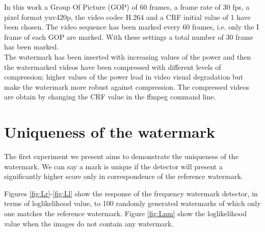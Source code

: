 In this work a Group Of Picture (GOP) of 60 frames, a frame rate of 30 fps, a pixel format yuv420p, the video codec H.264 and a CRF initial value of 1 have been chosen.\newline 
The video sequence has been marked every 60 frames, i.e. only the I frame of each GOP are marked.\newline 
With these settings a total number of 30 frame has been marked.\\
The watermark has been inserted with increasing values of the power and then the watermarked videos have been compressed with different levels of compression; higher values of the power lead in video visual degradation but make the watermark more robust against compression. \newline 
The compressed videos are obtain by changing the CRF value in the ffmpeg command line.



\section{Uniqueness of the watermark}

The first experiment we present aims to demonstrate the uniqueness of the watermark. We can say a mark is unique if the detector will present a significantly higher score only in correspondence of the reference watermark. 

Figures \ref{fig:Lr}-\ref{fig:Ll} show the response of the frequency watermark detector, in terms of loglikelihood value, to 100 randomly generated watermarks of which only one matches the reference watermark. Figure \ref{fig:Lnm} show the loglikelihood value when the images do not contain any watermark.

